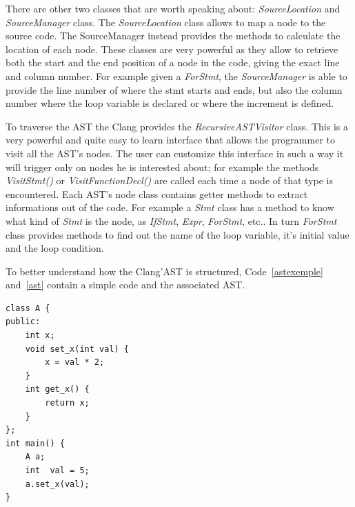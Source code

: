 \documentclass[a4paper,11pt,oneside]{book}
\begin{document}
There are other two classes that are worth speaking about: \emph{SourceLocation} and \emph{SourceManager} class. The \emph{SourceLocation} class allows to map a node to the source code. The SourceManager instead provides the methods to calculate the location of each node. These classes are very powerful as they allow to retrieve both the start and the end position of a node in the code, giving the exact line and column number. For example given a \emph{ForStmt}, the \emph{SourceManager} is able to provide the line number of where the stmt starts and ends, but also the column number where the loop variable is declared or where the increment is defined.

To traverse the AST the Clang provides the \emph{RecursiveASTVisitor} class. This is a very powerful and quite easy to learn interface that allows the programmer to visit all the AST’s nodes. The user can customize this interface in such a way it will trigger only on nodes he is interested about; for example the methods \emph{VisitStmt()} or \emph{VisitFunctionDecl()} are called each time a node of that type is encountered. Each AST’s node class contains getter methods to extract informations out of the code. For example a \emph{Stmt} class has a method to know what kind of \emph{Stmt} is the node, as \emph{IfStmt}, \emph{Expr}, \emph{ForStmt}, etc.. In turn \emph{ForStmt} class provides methods to find out the name of the loop variable, it’s initial value and the loop condition.

To better understand how the Clang’AST is structured, Code~\ref{astexemple} and~\ref{ast} contain a simple code and the associated AST.
\newline
\begin{lstlisting}[language=CCC, caption=Simple code., label=astexemple]
class A {
public:
	int x;
	void set_x(int val) {
		x = val * 2;
	}	
	int get_x() {
		return x;
	}
};
int main() {
	A a;
	int  val = 5;
	a.set_x(val);
}
\end{lstlisting}
\end{document}
